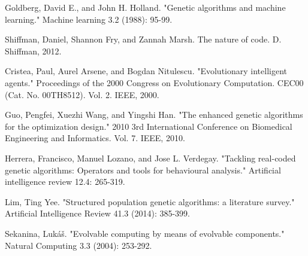 \documentclass[conference]{IEEEtran}
\begin{document}
\begin{thebibliography}{9}
Goldberg, David E., and John H. Holland. "Genetic algorithms and machine learning." Machine learning 3.2 (1988): 95-99.

Shiffman, Daniel, Shannon Fry, and Zannah Marsh. The nature of code. D. Shiffman, 2012.

Cristea, Paul, Aurel Arsene, and Bogdan Nitulescu. "Evolutionary intelligent agents." Proceedings of the 2000 Congress on Evolutionary Computation. CEC00 (Cat. No. 00TH8512). Vol. 2. IEEE, 2000.

Guo, Pengfei, Xuezhi Wang, and Yingshi Han. "The enhanced genetic algorithms for the optimization design." 2010 3rd International Conference on Biomedical Engineering and Informatics. Vol. 7. IEEE, 2010.

Herrera, Francisco, Manuel Lozano, and Jose L. Verdegay. "Tackling real-coded genetic algorithms: Operators and tools for behavioural analysis." Artificial intelligence review 12.4: 265-319.

Lim, Ting Yee. "Structured population genetic algorithms: a literature survey." Artificial Intelligence Review 41.3 (2014): 385-399.

Sekanina, Lukáš. "Evolvable computing by means of evolvable components." Natural Computing 3.3 (2004): 253-292.


\end{thebibliography}
\end{document}
